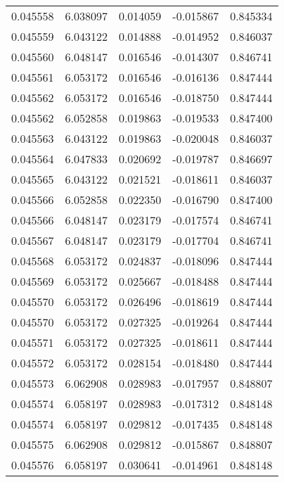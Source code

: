 \begin{tabular}{lrrrr}
0.045558    &  6.038097 &  0.014059 & -0.015867 &             0.845334 \\
0.045559    &  6.043122 &  0.014888 & -0.014952 &             0.846037 \\
0.045560    &  6.048147 &  0.016546 & -0.014307 &             0.846741 \\
0.045561    &  6.053172 &  0.016546 & -0.016136 &             0.847444 \\
0.045562    &  6.053172 &  0.016546 & -0.018750 &             0.847444 \\
0.045562    &  6.052858 &  0.019863 & -0.019533 &             0.847400 \\
0.045563    &  6.043122 &  0.019863 & -0.020048 &             0.846037 \\
0.045564    &  6.047833 &  0.020692 & -0.019787 &             0.846697 \\
0.045565    &  6.043122 &  0.021521 & -0.018611 &             0.846037 \\
0.045566    &  6.052858 &  0.022350 & -0.016790 &             0.847400 \\
0.045566    &  6.048147 &  0.023179 & -0.017574 &             0.846741 \\
0.045567    &  6.048147 &  0.023179 & -0.017704 &             0.846741 \\
0.045568    &  6.053172 &  0.024837 & -0.018096 &             0.847444 \\
0.045569    &  6.053172 &  0.025667 & -0.018488 &             0.847444 \\
0.045570    &  6.053172 &  0.026496 & -0.018619 &             0.847444 \\
0.045570    &  6.053172 &  0.027325 & -0.019264 &             0.847444 \\
0.045571    &  6.053172 &  0.027325 & -0.018611 &             0.847444 \\
0.045572    &  6.053172 &  0.028154 & -0.018480 &             0.847444 \\
0.045573    &  6.062908 &  0.028983 & -0.017957 &             0.848807 \\
0.045574    &  6.058197 &  0.028983 & -0.017312 &             0.848148 \\
0.045574    &  6.058197 &  0.029812 & -0.017435 &             0.848148 \\
0.045575    &  6.062908 &  0.029812 & -0.015867 &             0.848807 \\
0.045576    &  6.058197 &  0.030641 & -0.014961 &             0.848148 \\

\end{tabular}
